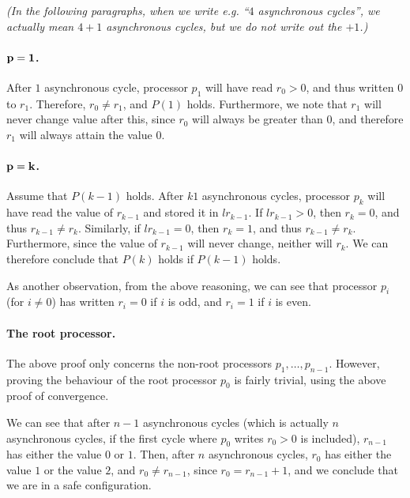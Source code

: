 \documentclass{article}
\begin{document}
\emph{(In the following paragraphs, when we write e.g. ``$4$ asynchronous cycles'', we actually mean $4 + 1$ asynchronous cycles, but we do not write out the $+ 1$.)}

\paragraph{$\bf p = 1$.}
After $1$ asynchronous cycle, processor $p_1$ will have read $r_0 > 0$, and thus written $0$ to $r_1$. Therefore, $r_0 \neq r_1$, and $P(1)$ holds. Furthermore, we note that $r_1$ will never change value after this, since $r_0$ will always be greater than $0$, and therefore $r_1$ will always attain the value $0$.

\paragraph{$\bf p = k$.}
Assume that $P(k - 1)$ holds. After $k1$ asynchronous cycles, processor $p_k$ will have read the value of $r_{k - 1}$ and stored it in $lr_{k - 1}$. If $lr_{k - 1} > 0$, then $r_k = 0$, and thus $r_{k - 1} \neq r_k$. Similarly, if $lr_{k - 1} = 0$, then $r_k = 1$, and thus $r_{k - 1} \neq r_k$. Furthermore, since the value of $r_{k - 1}$ will never change, neither will $r_k$. We can therefore conclude that $P(k)$ holds if $P(k - 1)$ holds.

As another observation, from the above reasoning, we can see that processor $p_i$ (for $i \neq 0$) has written $r_i = 0$ if $i$ is odd, and $r_i = 1$ if $i$ is even.

\paragraph{The root processor.}
The above proof only concerns the non-root processors $p_1, \ldots, p_{n - 1}$. However, proving the behaviour of the root processor $p_0$ is fairly trivial, using the above proof of convergence.

We can see that after $n - 1$ asynchronous cycles (which is actually $n$ asynchronous cycles, if the first cycle where $p_0$ writes $r_0 > 0$ is included), $r_{n - 1}$ has either the value $0$ or $1$. Then, after $n$ asynchronous cycles, $r_0$ has either the value $1$ or the value $2$, and $r_0 \neq r_{n - 1}$, since $r_0 = r_{n - 1} + 1$, and we conclude that we are in a safe configuration.
\end{document}
